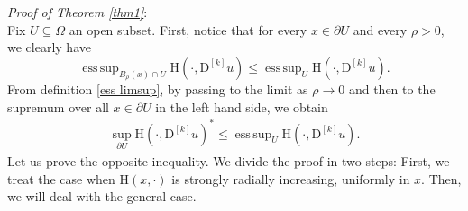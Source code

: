 \documentclass[a4paper,11pt]{article}
\numberwithin{equation}{section}
\newcommand{\Om}{\Omega}
\newcommand{\rom}{\mathrm}
\DeclareMathOperator*{\esssup}{ess\,sup}
\theoremstyle{definition}
\begin{document}
\textit{Proof of Theorem \ref{thm1}}:\\
Fix $U\subseteq\Om$ an open subset. First, notice that for every $x\in\partial U$ and every $\rho>0$, we clearly have
$$
\esssup_{B_\rho(x)\cap U}\rom{H}(\cdot,\mathrm D^{[k]}u)\leq \esssup_{ U}\rom{H}(\cdot,\mathrm D^{[k]}u).
$$ 
From definition \ref{ess limsup}, by passing to the limit as $\rho\to0$ and then to the supremum over all $x\in\partial U$ in the left hand side, we obtain
\begin{align}\label{one ineq}
\sup_{\partial U}\rom{H}(\cdot,\mathrm D ^{[k]}u)^*\leq\esssup_U \rom{H}(\cdot, \mathrm D ^{[k]}u).
\end{align}
Let us prove the opposite inequality. We divide the proof in two steps: First, we treat the case when $\rom{H}(x,\cdot)$ is strongly radially increasing, uniformly in $x$. Then, we will deal with the general case.\\
\end{document}
